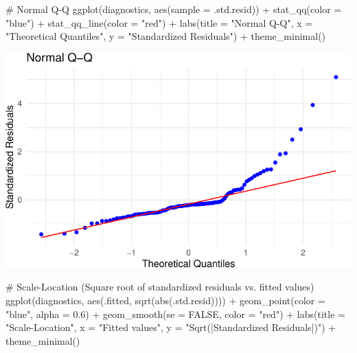 \documentclass[
  11pt,
]{article}
\newenvironment{Shaded}{\begin{snugshade}}{\end{snugshade}}
\newcommand{\AttributeTok}[1]{\textcolor[rgb]{0.40,0.45,0.13}{#1}}
\newcommand{\CommentTok}[1]{\textcolor[rgb]{0.37,0.37,0.37}{#1}}
\newcommand{\ConstantTok}[1]{\textcolor[rgb]{0.56,0.35,0.01}{#1}}
\newcommand{\FloatTok}[1]{\textcolor[rgb]{0.68,0.00,0.00}{#1}}
\newcommand{\FunctionTok}[1]{\textcolor[rgb]{0.28,0.35,0.67}{#1}}
\newcommand{\NormalTok}[1]{\textcolor[rgb]{0.00,0.23,0.31}{#1}}
\newcommand{\SpecialCharTok}[1]{\textcolor[rgb]{0.37,0.37,0.37}{#1}}
\newcommand{\StringTok}[1]{\textcolor[rgb]{0.13,0.47,0.30}{#1}}
\begin{document}
\begin{Shaded}
\begin{Highlighting}[]
\CommentTok{\# Normal Q{-}Q}
\FunctionTok{ggplot}\NormalTok{(diagnostics, }\FunctionTok{aes}\NormalTok{(}\AttributeTok{sample =}\NormalTok{ .std.resid)) }\SpecialCharTok{+}
  \FunctionTok{stat\_qq}\NormalTok{(}\AttributeTok{color =} \StringTok{"blue"}\NormalTok{) }\SpecialCharTok{+}
  \FunctionTok{stat\_qq\_line}\NormalTok{(}\AttributeTok{color =} \StringTok{"red"}\NormalTok{) }\SpecialCharTok{+}
  \FunctionTok{labs}\NormalTok{(}\AttributeTok{title =} \StringTok{"Normal Q{-}Q"}\NormalTok{, }\AttributeTok{x =} \StringTok{"Theoretical Quantiles"}\NormalTok{, }\AttributeTok{y =} \StringTok{"Standardized Residuals"}\NormalTok{) }\SpecialCharTok{+}
  \FunctionTok{theme\_minimal}\NormalTok{()}
\end{Highlighting}
\end{Shaded}

\includegraphics{HW-4-CODE-and-ANSWERS_files/figure-pdf/unnamed-chunk-2-1.pdf}

\begin{Shaded}
\begin{Highlighting}[]
\CommentTok{\# Scale{-}Location (Square root of standardized residuals vs. fitted values)}
\FunctionTok{ggplot}\NormalTok{(diagnostics, }\FunctionTok{aes}\NormalTok{(.fitted, }\FunctionTok{sqrt}\NormalTok{(}\FunctionTok{abs}\NormalTok{(.std.resid)))) }\SpecialCharTok{+}
  \FunctionTok{geom\_point}\NormalTok{(}\AttributeTok{color =} \StringTok{"blue"}\NormalTok{, }\AttributeTok{alpha =} \FloatTok{0.6}\NormalTok{) }\SpecialCharTok{+}
  \FunctionTok{geom\_smooth}\NormalTok{(}\AttributeTok{se =} \ConstantTok{FALSE}\NormalTok{, }\AttributeTok{color =} \StringTok{"red"}\NormalTok{) }\SpecialCharTok{+}
  \FunctionTok{labs}\NormalTok{(}\AttributeTok{title =} \StringTok{"Scale{-}Location"}\NormalTok{, }\AttributeTok{x =} \StringTok{"Fitted values"}\NormalTok{, }\AttributeTok{y =} \StringTok{"Sqrt(|Standardized Residuals|)"}\NormalTok{) }\SpecialCharTok{+}
  \FunctionTok{theme\_minimal}\NormalTok{()}
\end{Highlighting}
\end{Shaded}
\end{document}

